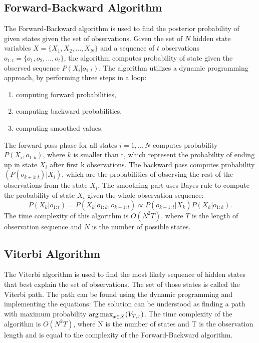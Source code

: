 \subsection{Forward-Backward Algorithm} 

The Forward-Backward algorithm is used to find the posterior probability of given states given the set of observations.
Given the set of $N$ hidden state variables $X = \{X_1, X_2, ..., X_N\}$ and a sequence of $t$ observations $o_{1:t} = \{o_1, o_2,...,o_t\}$, the algorithm computes probability of state given the observed sequence $P(X_i | o_{1:t})$.
The algorithm utilizes a dynamic programming approach, by performing three steps in a loop: 
\begin{enumerate}
\item computing forward probabilities,
\item computing backward probabilities,
\item computing smoothed values.
\end{enumerate}
The forward pass phase for all states $i=1,..,N$ computes probability $P(X_i, o_{1:k})$, where $k$ is smaller than t, which represent the probability of ending up in state $X_i$ after first k observations. 
The backward pass computes probability $(P(o_{k+1:t}) | X_i)$, which are the probabilities of observing the rest of the observations from the state $X_i$.
The smoothing part uses Bayes rule to compute the probability of state $X_i$ given the whole observation sequence:
\begin{equation}
P(X_k | o_{1:t}) = P(X_k | o_{1:k}, o_{k+1:t}) \propto P(o_{k+1:t} | X_k) P(X_k | o_{1:k}).
\end{equation}
The time complexity of this algorithm is $O(N^2 T)$, where $T$ is the length of observation sequence and $N$ is the number of possible states.


\subsection{Viterbi Algorithm}

The Viterbi algorithm is used to find the most likely sequence of hidden states that best explain the set of observations.
The set of those states is called the Viterbi path. 
The path can be found using the dynamic programming and implementing the equations:
The solution can be understood as finding a path with maximum probability $\operatorname*{arg\,max}_{x\in X}(V_{T,x})$. 
The time complexity of the algorithm is $O(N^2 T)$, where N is the number of states and T is the observation length and is equal to the complexity of the Forward-Backward algorithm.

